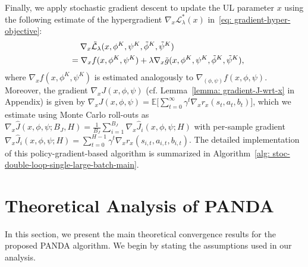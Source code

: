 \documentclass{article}
\theoremstyle{plain}
\theoremstyle{definition}
\theoremstyle{remark}
\def\E{\mathbb E}
\begin{document}
Finally, we apply stochastic gradient descent to update the UL parameter $x$ using the following estimate of the hypergradient $\nabla_x \mathcal{L}_\lambda^*(x)$ in~\eqref{eq: gradient-hyper-objective}:
\vspace{-1mm}
\begin{align}
    &\quad\; \nabla_x \tilde{\mathcal{L}}_\lambda(x,\phi^K,\psi^K,\tilde{\phi}^K,\tilde{\psi}^K) \notag \\
     &=   \nabla_x f(x,\phi^K,\psi^K) + \lambda \nabla_x \tilde{g}(x,\phi^K,\psi^K,\tilde{\phi}^K,\tilde{\psi}^K),\!\!\! \label{eq: estimated-gradient-hyper-objective}
\end{align}
where $\nabla_x f(x,\phi^K,\psi^K)$ is estimated analogously to $\nabla_{(\phi,\psi)} f(x,\phi,\psi)$. Moreover, the gradient $\nabla_x J(x,\phi,\psi)$ (cf. Lemma~\ref{lemma: gradient-J-wrt-x} in Appendix) is given by $\nabla_x J(x,\phi,\psi) \allowbreak= \E \big[\sum_{t=0}^{\infty} \gamma^t \nabla_x r_x(s_t,a_t,b_t)\big]$, which we estimate using Monte Carlo roll-outs as $\nabla_x \hat{J}(x,\phi,\psi;B_J,H) = \frac{1}{B_J}\sum_{i=1}^{B_J} \nabla_x \hat{J}_i(x,\phi,\psi;H)$ with per-sample gradient $\nabla_x \hat{J}_i(x,\phi,\psi;H) \allowbreak= \sum_{t=0}^{H-1} \gamma^t \nabla_x r_x(s_{i,t},a_{i,t},b_{i,t})$. The detailed implementation of this policy-gradient-based algorithm is summarized in Algorithm~\ref{alg: stoc-double-loop-single-large-batch-main}.



\section{Theoretical Analysis of PANDA}
\label{sec: theoretical-analysis}
In this section, we present the main theoretical convergence results for the proposed PANDA algorithm. We begin by stating the assumptions used in our analysis.

\end{document}
